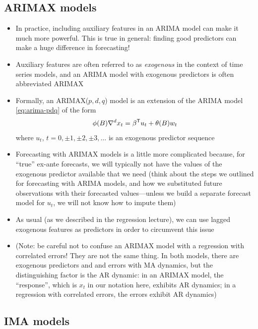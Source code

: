 \documentclass{article}
\begin{document}
\subsection{ARIMAX models}

\begin{itemize}
\item In practice, including auxiliary features in an ARIMA model can make it
  much more powerful. This is true in general: finding good predictors can make
  a huge difference in forecasting!

\item Auxiliary features are often referred to as \emph{exogenous} in the
  context of time series models, and an ARIMA model with exogenous predictors is
  often abbreviated ARIMAX 

\item Formally, an ARIMAX($p,d,q$) model is an extension of the ARIMA model 
  \eqref{eq:arima-pdq} of the form 
  \[
  \phi(B) \nabla^d x_t = \beta^{\mathsf{T}} u_t + \theta(B) w_t
  \]
  where $u_t$, $t = 0, \pm 1, \pm 2, \pm 3, \dots$ is an exogenous predictor
  sequence 

\item Forecasting with ARIMAX models is a little more complicated because, for
  ``true'' ex-ante forecasts, we will typically not have the values of the
  exogenous predictor available that we need (think about the steps we outlined
  for forecasting with ARIMA models, and how we substituted future observations
  with their forecasted values---unless we build a separate forecast model for
  $u_t$, we will not know how to impute them) 

\item As usual (as we described in the regression lecture), we can use lagged
  exogenous features as predictors in order to circumvent this issue

\item (Note: be careful not to confuse an ARIMAX model with a regression with 
  correlated errors! They are not the same thing. In both models, there are
  exogenous predictors and and errors with MA dynamics, but the distinguishing  
  factor is the AR dynamic: in an ARIMAX model, the ``response'', which is $x_t$
  in our notation here, exhibits AR dynamics; in a regression with correlated
  errors, the errors exhibit AR dynamics) 
\end{itemize}

\subsection{IMA models}
\end{document}
